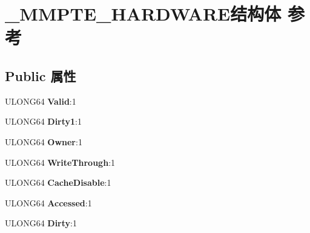 \hypertarget{struct___m_m_p_t_e___h_a_r_d_w_a_r_e}{}\section{\+\_\+\+M\+M\+P\+T\+E\+\_\+\+H\+A\+R\+D\+W\+A\+R\+E结构体 参考}
\label{struct___m_m_p_t_e___h_a_r_d_w_a_r_e}
\subsection*{Public 属性}
\begin{DoxyCompactItemize}
\item 
\mbox{\label{struct___m_m_p_t_e___h_a_r_d_w_a_r_e_a380e72254e1a67428c77ccdc3c4285ee}} 
U\+L\+O\+N\+G64 {\bfseries Valid}\+:1
\item 
\mbox{\label{struct___m_m_p_t_e___h_a_r_d_w_a_r_e_a013267113928dd9e3f7362b1852d1033}} 
U\+L\+O\+N\+G64 {\bfseries Dirty1}\+:1
\item 
\mbox{\label{struct___m_m_p_t_e___h_a_r_d_w_a_r_e_a63c114180efcfc91c703086ac042e285}} 
U\+L\+O\+N\+G64 {\bfseries Owner}\+:1
\item 
\mbox{\label{struct___m_m_p_t_e___h_a_r_d_w_a_r_e_a38bc207a072892caa54a5fbc7812cf48}} 
U\+L\+O\+N\+G64 {\bfseries Write\+Through}\+:1
\item 
\mbox{\label{struct___m_m_p_t_e___h_a_r_d_w_a_r_e_a2e371796876ea020d8918cbf63383151}} 
U\+L\+O\+N\+G64 {\bfseries Cache\+Disable}\+:1
\item 
\mbox{\label{struct___m_m_p_t_e___h_a_r_d_w_a_r_e_a2658895a3cb0edad259470aff9b90eb0}} 
U\+L\+O\+N\+G64 {\bfseries Accessed}\+:1
\item 
\mbox{\label{struct___m_m_p_t_e___h_a_r_d_w_a_r_e_a1e581c58bd59b5a0e0b66affaae7fd9c}} 
U\+L\+O\+N\+G64 {\bfseries Dirty}\+:1
\item 
\mbox{\label{struct___m_m_p_t_e___h_a_r_d_w_a_r_e_a230cfaa6e182d1ccf0ba8b9ed5dc3714}} 

\end{DoxyCompactItemize}

